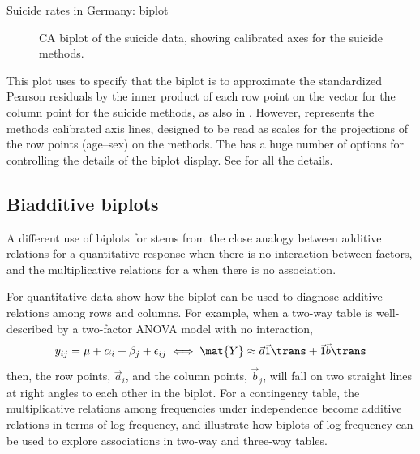 \documentclass[11pt]{book}
\begin{document}
\begin{Example}[suicide3]{Suicide rates in Germany: biplot}
\begin{figure}[!htb]
\caption{CA biplot of the suicide data, showing calibrated axes for the suicide methods.}
\label{fig:cabipl-suicide}
\end{figure}
This plot uses  to specify that the biplot is to
approximate the standardized Pearson residuals by the inner product of each row
point on the vector for the column point for the suicide methods, as
also in .  However, 
represents the methods calibrated axis lines, designed to be read as scales 
for the projections of the row points (age--sex) on the methods.
The  has a huge number of options for controlling the details
of the biplot display.  See \citep[Ch. 2]{Gower-etal:2011} for all the details.


\end{Example}

\subsection{Biadditive biplots}
A different use of biplots for \ctabs stems from the close analogy between
additive relations for a quantitative response when there is no interaction
between factors, and the multiplicative relations for a \ctab when there is
no association.

For quantitative data \citet{BraduGabriel:78} show how the biplot can be used
to diagnose additive relations among rows and columns. For example, when
a two-way table is well-described by a two-factor ANOVA model with no
interaction,
\begin{equation*}%
y_{ij} = \mu + \alpha_i + \beta_j + \epsilon_{ij} 
\iff \mat{Y} \approx \vec{a} \vec{1}\trans + \vec{1} \vec{b}\trans
\end{equation*}
then, the row points, $\vec{a}_i$, and the column points, $\vec{b}_j$,
will fall on two straight lines at right angles to each other in the
biplot.
For a contingency table, the multiplicative relations among
frequencies under independence become additive relations
in terms of log frequency,
and \citet{Gabriel-etal:97} illustrate how biplots of log frequency
can be used to explore associations in two-way and three-way tables.
\end{document}

